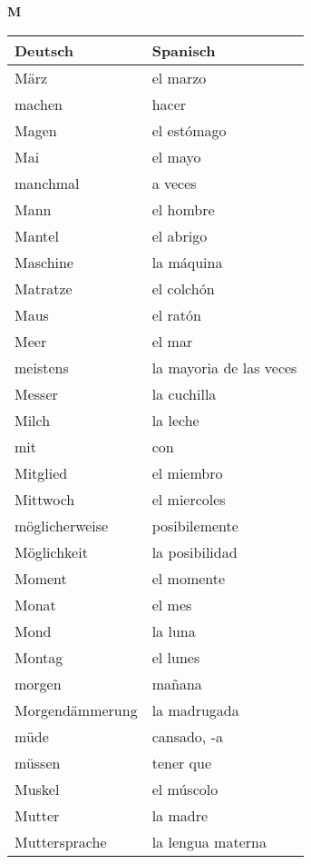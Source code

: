 \begin{flushright}\begin{Huge}\textbf{M}\end{Huge}\end{flushright}

\begin{longtable}{p{} p{}} 
\textbf{Deutsch}     & \textbf{Spanisch}                                       \\ \hline
\hline
\endhead %
März & el marzo\\
machen & hacer\\
Magen & el estómago\\
Mai & el mayo\\
manchmal & a veces\\
Mann & el hombre\\
Mantel & el abrigo\\
Maschine & la máquina\\
Matratze & el colchón\\
Maus & el ratón\\
Meer & el mar\\
meistens & la mayoria de las veces\\
Messer & la cuchilla\\
Milch & la leche\\
mit & con\\
Mitglied & el miembro\\
Mittwoch & el miercoles\\
möglicherweise & posibilemente\\
Möglichkeit & la posibilidad\\
Moment & el momente \\
Monat & el mes\\
Mond & la luna\\
Montag & el lunes \\
morgen & mañana\\
Morgendämmerung & la madrugada\\
müde & cansado, -a\\
müssen & tener que\\
Muskel & el múscolo\\
Mutter & la madre\\
Muttersprache & la lengua materna\\

\end{longtable}

